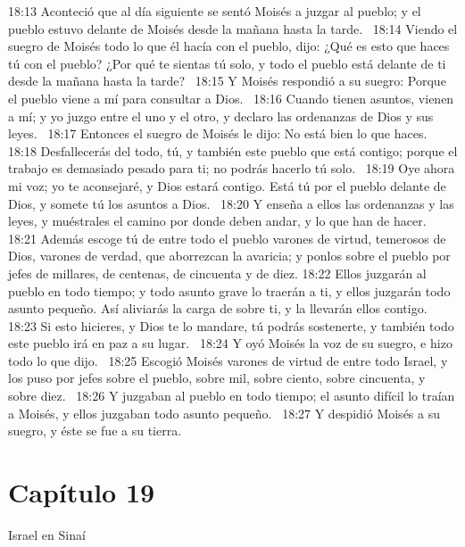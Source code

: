 18:13 Aconteció que al día siguiente se sentó Moisés a juzgar al pueblo; y el pueblo estuvo delante de Moisés desde la mañana hasta la tarde.  
18:14 Viendo el suegro de Moisés todo lo que él hacía con el pueblo, dijo: ¿Qué es esto que haces tú con el pueblo? ¿Por qué te sientas tú solo, y todo el pueblo está delante de ti desde la mañana hasta la tarde?  
18:15 Y Moisés respondió a su suegro: Porque el pueblo viene a mí para consultar a Dios.  
18:16 Cuando tienen asuntos, vienen a mí; y yo juzgo entre el uno y el otro, y declaro las ordenanzas de Dios y sus leyes.  
18:17 Entonces el suegro de Moisés le dijo: No está bien lo que haces.  
18:18 Desfallecerás del todo, tú, y también este pueblo que está contigo; porque el trabajo es demasiado pesado para ti; no podrás hacerlo tú solo.  
18:19 Oye ahora mi voz; yo te aconsejaré, y Dios estará contigo. Está tú por el pueblo delante de Dios, y somete tú los asuntos a Dios.  
18:20 Y enseña a ellos las ordenanzas y las leyes, y muéstrales el camino por donde deben andar, y lo que han de hacer. 
18:21 Además escoge tú de entre todo el pueblo varones de virtud, temerosos de Dios, varones de verdad, que aborrezcan la avaricia; y ponlos sobre el pueblo por jefes de millares, de centenas, de cincuenta y de diez. 
18:22 Ellos juzgarán al pueblo en todo tiempo; y todo asunto grave lo traerán a ti, y ellos juzgarán todo asunto pequeño. Así aliviarás la carga de sobre ti, y la llevarán ellos contigo.  
18:23 Si esto hicieres, y Dios te lo mandare, tú podrás sostenerte, y también todo este pueblo irá en paz a su lugar.  
18:24 Y oyó Moisés la voz de su suegro, e hizo todo lo que dijo.  
18:25 Escogió Moisés varones de virtud de entre todo Israel, y los puso por jefes sobre el pueblo, sobre mil, sobre ciento, sobre cincuenta, y sobre diez.  
18:26 Y juzgaban al pueblo en todo tiempo; el asunto difícil lo traían a Moisés, y ellos juzgaban todo asunto pequeño.  
18:27 Y despidió Moisés a su suegro, y éste se fue a su tierra.  
\section*{Capítulo 19 }
Israel en Sinaí 


